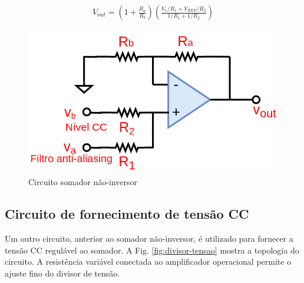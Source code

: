 \begin{align}
	V_{out} = \left(1+\frac{R_a}{R_b}\right)\left(\frac{V_1/R_1 + V_{REF}/R_2}{1/R_1 + 1/R_2}\right)\label{eq:circuito-somador}
\end{align}

\begin{figure}[!hbt]
	\begin{center}
		\includegraphics[scale=0.25]{figuras/Somador_Nao-Inversor.png}
		\caption{Circuito somador não-inversor}
		\label{fig:somador-ninversor}
	\end{center}
\end{figure}

\subsection{Circuito de fornecimento de tensão CC}

Um outro circuito, anterior ao somador não-inversor, é utilizado para fornecer a tensão CC regulável ao somador.
A Fig. \ref{fig:divisor-tensao} mostra a topologia do circuito. A resistência variável conectada ao amplificador operacional permite o ajuste fino do divisor de tensão.


